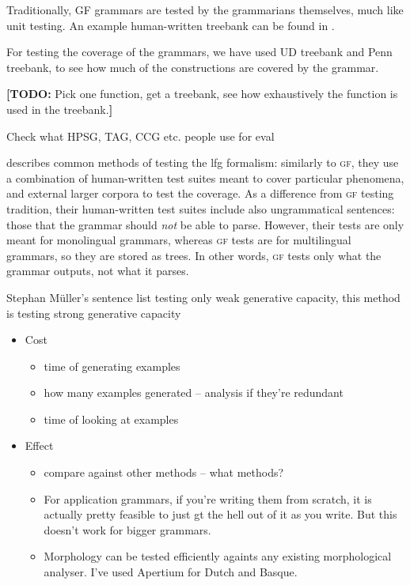 \documentclass[11pt]{article}
\def\gf{\textsc{gf}}
\newcommand{\todo}[1]{{\color{cyan}\textbf{[TODO: }#1\textbf{]}}}
\begin{document}
Traditionally, GF grammars are tested by the grammarians themselves,
much like unit testing. An example human-written treebank can be found
in \cite[p.~136--142]{khegai2006phd}.

For testing the coverage of the grammars, we have used UD treebank
\cite{nivre2016ud} and Penn treebank, to see how much of the
constructions are covered by the grammar.

\todo{Pick one function, get a treebank, see how exhaustively the function
is used in the treebank.}

Check what HPSG, TAG, CCG etc. people use for eval

\cite[pp.~212--213]{butt1999lfg} describes common methods of testing the
{\sc lfg} formalism: similarly to \gf, they use a combination of
human-written test suites meant to cover particular phenomena, and
external larger corpora to test the coverage. As a difference from \gf{}
testing tradition, their human-written test suites include also
ungrammatical sentences: those that the grammar should \emph{not} be
able to parse. However, their tests are only meant for monolingual
grammars, whereas \gf{} tests are for multilingual grammars, so they are
stored as trees. In other words, \gf{} tests only what the grammar
outputs, not what it parses.

Stephan Müller's sentence list testing only weak generative capacity,
this method is testing strong generative capacity


\begin{itemize}
\item Cost
  \begin{itemize}
  \item time of generating examples
  \item how many examples generated -- analysis if they're redundant
  \item time of looking at examples
  \end{itemize}

\item Effect
  \begin{itemize}
  \item compare against other methods -- what methods?
  \item For application grammars, if you're writing them from scratch, it is actually pretty feasible to just gt the hell out of it as you write. But this doesn't work for bigger grammars.
  \item Morphology can be tested efficiently againts any existing morphological analyser. I've used Apertium for Dutch and Basque.
  \end{itemize}
\end{itemize}
\end{document}
